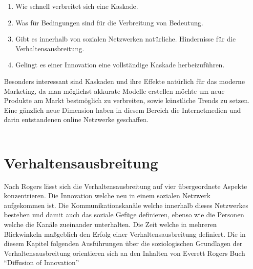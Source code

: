 \documentclass[12pt]{article}
\begin{document}
\begin{enumerate}
\item Wie schnell verbreitet sich eine Kaskade.
\item Was für Bedingungen sind für die Verbreitung von Bedeutung.
\item Gibt es innerhalb von sozialen Netzwerken natürliche. Hindernisse für die Verhaltensausbreitung.
\item Gelingt es einer Innovation eine vollständige Kaskade herbeizuführen.
\end{enumerate}
Besonders interessant sind Kaskaden und ihre Effekte natürlich für das moderne Marketing, da man möglichst akkurate Modelle erstellen möchte um neue Produkte am Markt bestmöglich zu verbreiten, sowie künstliche Trends zu setzen. Eine gänzlich neue Dimension haben in diesem Bereich die Internetmedien und darin entstandenen online Netzwerke geschaffen.\\\\



\section{Verhaltensausbreitung}
Nach Rogers lässt sich die Verhaltensausbreitung auf vier übergeordnete Aspekte konzentrieren. Die Innovation welche neu in  einem sozialen Netzwerk aufgekommen ist. Die Kommunikationskanäle welche innerhalb dieses Netzwerkes bestehen und damit auch das soziale Gefüge definieren, ebenso wie die Personen welche die Kanäle zueinander unterhalten. Die Zeit welche in mehreren Blickwinkeln maßgeblich den Erfolg einer Verhaltensausbreitung definiert. Die in diesem Kapitel folgenden Ausführungen über die soziologischen Grundlagen der Verhaltensausbreitung orientieren sich an den Inhalten von Everett Rogers Buch "`Diffusion of Innovation"' \cite{Rogers03}
\end{document}
